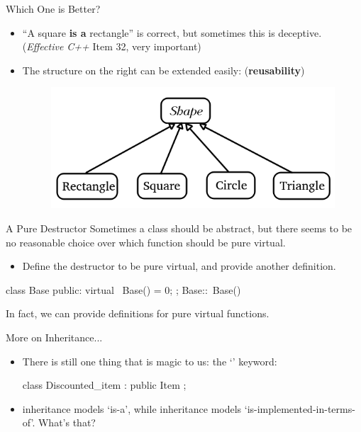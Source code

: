 \documentclass{beamer}
\begin{document}
\begin{frame}{Which One is Better?}
    \begin{itemize}
        \item ``A square \textbf{is a} rectangle'' is correct, but sometimes this is deceptive. (\textit{Effective C++} Item 32, very important)
        \item The structure on the right can be extended easily: (\textbf{reusability})
        \begin{figure}[h]
            \centering
            \includegraphics[scale=0.6]{img/shape_extended.png}
        \end{figure}
    \end{itemize}
\end{frame}

\begin{frame}[fragile]{A Pure \virtual Destructor}
    Sometimes a class should be abstract, but there seems to be no reasonable choice over which function should be pure virtual.
    \pause
    \begin{itemize}
        \item Define the destructor to be pure virtual, and provide another definition.
    \end{itemize}
    \begin{cpp}
class Base {
 public:
  virtual ~Base() = 0;
};
Base::~Base() {}
    \end{cpp}
    In fact, we can provide definitions for pure virtual functions.
\end{frame}

\begin{frame}[fragile]{More on Inheritance...}
    \begin{itemize}
        \item There is still one thing that is magic to us: the `' keyword:
        \begin{cpp}
class Discounted_item : public Item {};
        \end{cpp}
        \item \public inheritance models `is-a', while \private inheritance models `is-implemented-in-terms-of'. What's that?
    \end{itemize}
\end{frame}
\end{document}
